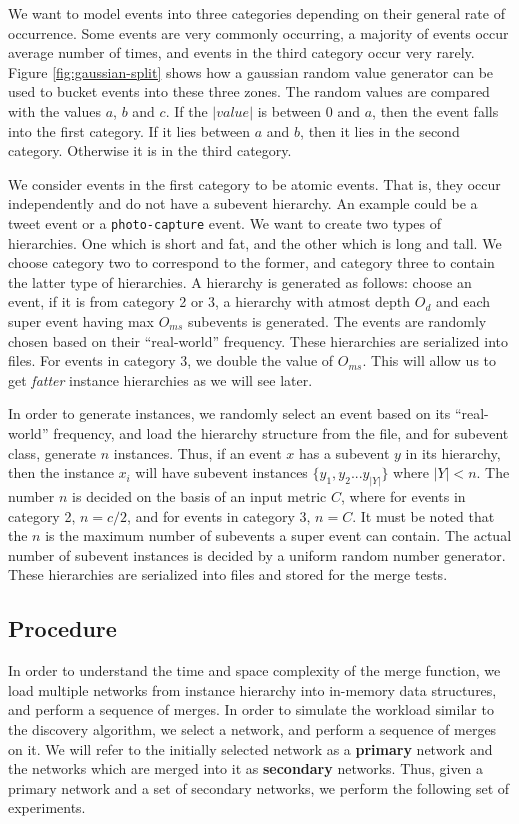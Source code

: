 We want to model events into three categories depending on their general rate of occurrence. Some events are very commonly occurring, a majority of events occur average number of times, and events in the third category occur very rarely. Figure \ref{fig:gaussian-split} shows how a gaussian random value generator can be used to bucket events into these three zones. The random values are compared with the values $a$, $b$ and $c$. If the $|value|$ is between 0 and $a$, then the event falls into the first category. If it lies between $a$ and $b$, then it lies in the second category. Otherwise it is in the third category.

We consider events in the first category to be atomic events. That is, they occur independently and do not have a subevent hierarchy. An example could be a tweet event or a \texttt{photo-capture} event. We want to create two types of hierarchies. One which is short and fat, and the other which is long and tall. We choose category two to correspond to the former, and category three to contain the latter type of hierarchies. A hierarchy is generated as follows: choose an event, if it is from category 2 or 3, a hierarchy with atmost depth $O_d$ and each super event having max $O_{ms}$ subevents is generated. The events are randomly chosen based on their ``real-world'' frequency. These hierarchies are serialized into files. For events in category 3, we double the value of $O_{ms}$. This will allow us to get \textit{fatter} instance hierarchies as we will see later.

In order to generate instances, we randomly select an event based on its ``real-world'' frequency, and load the hierarchy structure from the file, and for subevent class, generate $n$ instances. Thus, if an event $x$ has a subevent $y$ in its hierarchy, then the instance $x_i$ will have subevent instances $\{y_1, y_2 ... y_{|Y|}\}$ where $|Y| < n$. The number $n$ is decided on the basis of an input metric $C$, where for events in category 2, $n = c/2$, and for events in category 3, $n = C$. It must be noted that the $n$ is the maximum number of subevents a super event can contain. The actual number of subevent instances is decided by a uniform random number generator. These hierarchies are serialized into files and stored for the merge tests.

\subsection{Procedure}
In order to understand the time and space complexity of the merge function, we load multiple networks from instance hierarchy into in-memory data structures, and perform a sequence of merges. In order to simulate the workload similar to the discovery algorithm, we select a network, and perform a sequence of merges on it. We will refer to the initially selected network as a \textbf{primary} network and the networks which are merged into it as \textbf{secondary} networks. Thus, given a primary network and a set of secondary networks, we perform the following set of experiments.

